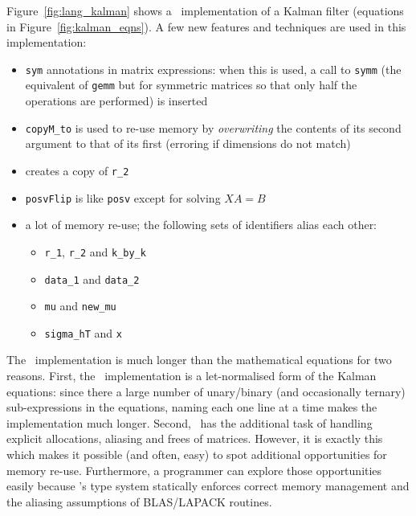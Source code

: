 Figure~\ref{fig:lang_kalman} shows a \lang\ implementation of a Kalman filter
(equations in Figure~\ref{fig:kalman_eqns}). A few new features and techniques
are used in this implementation:
\begin{itemize}

    \item \texttt{sym} annotations in matrix expressions: when this is used, a 
        call to \texttt{symm} (the equivalent of \texttt{gemm} but for
        symmetric matrices so that only half the operations are performed) is
        inserted

    \item \texttt{copyM\_to} is used to re-use memory by \emph{overwriting} the
        contents of its second argument to that of its first (erroring if
        dimensions do not match)

    \item {} creates a copy of \texttt{r\_2}

    \item \texttt{posvFlip} is like \texttt{posv} except for solving $XA = B$

    \item a lot of memory re-use; the following sets of identifiers alias each other:
        \begin{itemize}
            \item \texttt{r\_1}, \texttt{r\_2} and \texttt{k\_by\_k}
            \item \texttt{data\_1} and \texttt{data\_2}
            \item \texttt{mu} and \texttt{new\_mu}
            \item \texttt{sigma\_hT} and \texttt{x}
        \end{itemize}

\end{itemize}

The \lang\ implementation is much longer than the mathematical equations for
two reasons. First, the \lang\ implementation is a let-normalised form of the
Kalman equations: since there a large number of unary/binary (and occasionally
ternary) sub-expressions in the equations, naming each one line at a time makes
the implementation much longer.  Second, \lang\ has the additional task of
handling explicit allocations, aliasing and frees of matrices. However, it is
exactly this which makes it possible (and often, easy) to spot additional
opportunities for memory re-use. Furthermore, a programmer can explore those
opportunities easily because \lang's type system statically enforces correct
memory management and the aliasing assumptions of BLAS/LAPACK routines.

